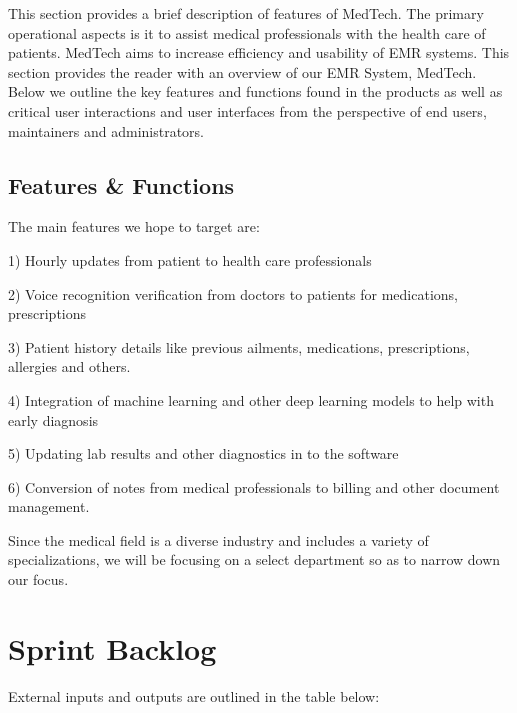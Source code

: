 This section provides a brief description of features of MedTech. The primary operational aspects is it to assist medical professionals with the health care of patients. MedTech aims to increase efficiency and usability of EMR systems. This section provides the reader with an overview of our EMR System, MedTech. Below we outline the key features and functions found in the products as well as critical user interactions and user interfaces from the perspective of end users, maintainers and administrators. 

\subsection{Features \& Functions}

The main features we hope to target are: 

1) Hourly updates from patient to health care professionals 

2) Voice recognition verification from doctors to patients for medications, prescriptions 

3) Patient history details like previous ailments, medications, prescriptions, allergies and others. 

4) Integration of machine learning and other deep learning models to help with early diagnosis 

5) Updating lab results and other diagnostics in to the software 

6) Conversion of notes from medical professionals to billing and other document management. 

Since the medical field is a diverse industry and includes a variety of specializations, we will be focusing on a select department so as to narrow down our focus. 





\section{Sprint Backlog}
External inputs and outputs are outlined in the table below:  \\ %



